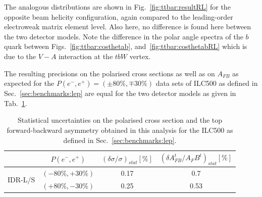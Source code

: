 The analogous distributions are shown in Fig.~\ref{fig:ttbar:resultRL} for the opposite beam helicity configuration, again compared to the leading-order electroweak matrix element level. Also here, no difference is found here between the two detector models.  Note the difference in the polar angle spectra of the $b$ quark between Figs.~\ref{fig:ttbar:costhetab}, and~\ref{fig:ttbar:costhetabRL} which is due to the $V-A$ interaction at the $tbW$ vertex.

The resulting precisions on the polarised cross sections as well as on $A_{FB}$ as expected for the $P(e^-,e^+)=(\pm 80\%, \mp 30\%)$ data sets of ILC500 as defined in Sec.~\ref{sec:benchmarks:lep} are equal for the two detector models as given in Tab.~\ref{tab:AFBtt}.

\begin{table}[htb]
\begin{center}
\begin{tabular}{|c|c|c|c|}
\hline
 & $P(e^-,e^+)$ & $(\delta\sigma / \sigma)_{stat} [\%]$ & $(\delta A_{FB}^t / A_FB^t)_{stat} [\%]$ \\
\hline
\multirow{2}{*}{IDR-L/S} &  $(-80\%,+30\%)$ & 0.17 & 0.7 \\
                         &  $(+80\%,-30\%)$ & 0.25 & 0.53 \\
\hline
\end{tabular}
\end{center}
\caption{Statistical uncertainties on the polarised cross section and the top forward-backward asymmetry obtained in this analysis for the ILC500 as defined in Sec.~\ref{sec:benchmarks:lep}.}
\label{tab:AFBtt}   
\end{table}    

